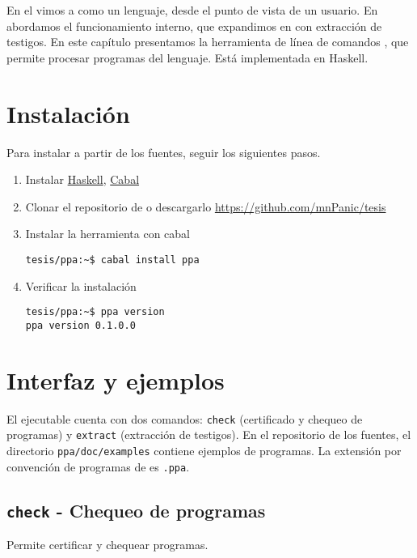 En el  vimos a \ppaLang{} como un lenguaje, desde el punto de
vista de un usuario. En  abordamos el funcionamiento
interno, que expandimos en  con extracción de
testigos. En este capítulo presentamos la herramienta de línea de comandos
\ppaTool{}, que permite procesar programas del lenguaje. Está implementada en Haskell.

\section{Instalación}

Para instalar \ppaTool{} a partir de los fuentes, seguir los siguientes pasos.

\begin{enumerate}
    \item Instalar \href{https://www.haskell.org/}{Haskell}, \href{https://www.haskell.org/cabal/}{Cabal}
    \item Clonar el repositorio de \ppaTool{} o descargarlo \url{https://github.com/mnPanic/tesis}
    \item Instalar la herramienta con cabal
    \begin{verbatim}
tesis/ppa:~$ cabal install ppa
    \end{verbatim}
    \item Verificar la instalación
    \begin{verbatim}
tesis/ppa:~$ ppa version
ppa version 0.1.0.0
    \end{verbatim}
\end{enumerate}

\section{Interfaz y ejemplos}

El ejecutable \ppaTool{} cuenta con dos comandos: \texttt{check} (certificado y
chequeo de programas) y \texttt{extract} (extracción de testigos). En el
repositorio de los fuentes, el directorio \texttt{ppa/doc/examples} contiene
ejemplos de programas. La extensión por convención de programas de \ppaTool{} es \texttt{.ppa}.

\subsection{\texttt{check} - Chequeo de programas}

Permite certificar y chequear programas.

